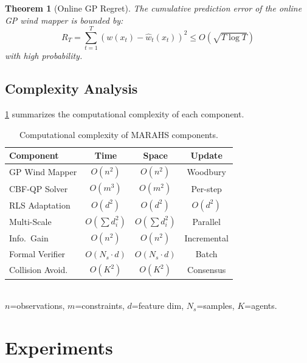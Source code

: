 \documentclass[11pt,twocolumn]{article}
\providecommand{\Cref}[1]{\ref{#1}}
\newtheorem{theorem}{Theorem}[section]
\theoremstyle{definition}
\begin{document}
\begin{theorem}[Online GP Regret]
\label{thm:gp_regret}
The cumulative prediction error of the online GP wind mapper is bounded by:
\begin{equation}
R_T = \sum_{t=1}^T (w(x_t) - \hat{w}_t(x_t))^2 \leq O(\sqrt{T \log T})
\end{equation}
with high probability.
\end{theorem}

\subsection{Complexity Analysis}

\Cref{tab:complexity} summarizes the computational complexity of each component.

\begin{table}[t]
\centering
\caption{Computational complexity of MARAHS components.}
\label{tab:complexity}
\small
\begin{tabular}{lccc}
\toprule
\textbf{Component} & \textbf{Time} & \textbf{Space} & \textbf{Update} \\
\midrule
GP Wind Mapper & $O(n^2)$ & $O(n^2)$ & Woodbury \\
CBF-QP Solver & $O(m^3)$ & $O(m^2)$ & Per-step \\
RLS Adaptation & $O(d^2)$ & $O(d^2)$ & $O(d^2)$ \\
Multi-Scale & $O(\sum d_i^2)$ & $O(\sum d_i^2)$ & Parallel \\
Info.\ Gain & $O(n^2)$ & $O(n^2)$ & Incremental \\
Formal Verifier & $O(N_s \cdot d)$ & $O(N_s \cdot d)$ & Batch \\
Collision Avoid. & $O(K^2)$ & $O(K^2)$ & Consensus \\
\bottomrule
\end{tabular}
\vspace{0.3em}\\
{\footnotesize $n$=observations, $m$=constraints, $d$=feature dim, $N_s$=samples, $K$=agents.}
\end{table}

\section{Experiments}
\label{sec:experiments}
\end{document}
